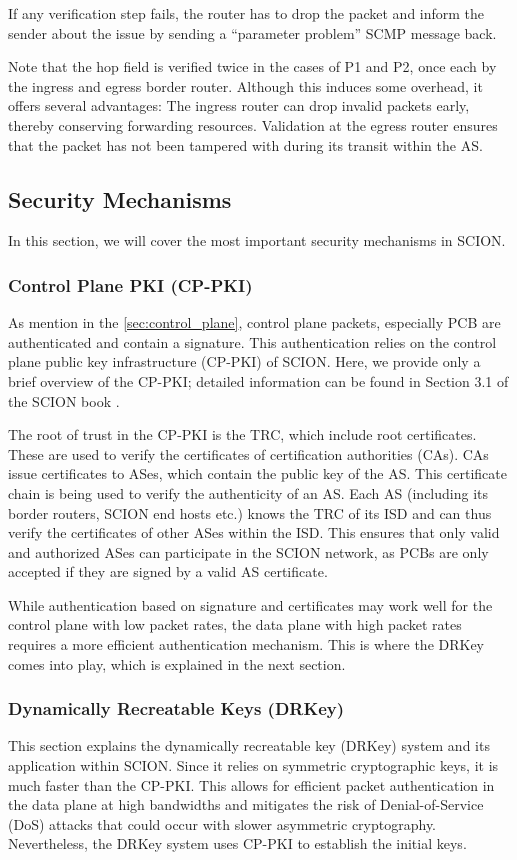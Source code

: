 If any verification step fails, the router has to drop the packet and inform the sender about the issue by sending a ``parameter problem'' SCMP message back.

Note that the hop field is verified twice in the cases of P1 and P2, once each by the ingress and egress border router.
Although this induces some overhead, it offers several advantages:
The ingress router can drop invalid packets early, thereby conserving forwarding resources.
Validation at the egress router ensures that the packet has not been tampered with during its transit within the AS.


\subsection{Security Mechanisms}
In this section, we will cover the most important security mechanisms in SCION.


\subsubsection{Control Plane PKI (CP-PKI)}
\label{sec:cp_pki}
As mention in the \cref{sec:control_plane}, control plane packets, especially PCB are authenticated and contain a signature.
This authentication relies on the control plane public key infrastructure (CP-PKI) of SCION.
Here, we provide only a brief overview of the CP-PKI; detailed information can be found in Section 3.1 of the SCION book \cite{Perrig2022}.

The root of trust in the CP-PKI is the TRC, which include root certificates.
These are used to verify the certificates of certification authorities (CAs).
CAs issue certificates to ASes, which contain the public key of the AS.
This certificate chain is being used to verify the authenticity of an AS.
Each AS (including its border routers, SCION end hosts etc.) knows the TRC of its ISD and can thus verify the certificates of other ASes within the ISD.
This ensures that only valid and authorized ASes can participate in the SCION network, as PCBs are only accepted if they are signed by a valid AS certificate.

While authentication based on signature and certificates may work well for the control plane with low packet rates, the data plane with high packet rates requires a more efficient authentication mechanism.
This is where the DRKey comes into play, which is explained in the next section.

\subsubsection{Dynamically Recreatable Keys (DRKey)}
\label{sec:drkey}
This section explains the dynamically recreatable key (DRKey) system and its application within SCION.
Since it relies on symmetric cryptographic keys, it is much faster than the CP-PKI.
This allows for efficient packet authentication in the data plane at high bandwidths and mitigates the risk of Denial-of-Service (DoS) attacks that could occur with slower asymmetric cryptography.
Nevertheless, the DRKey system uses CP-PKI to establish the initial keys.

